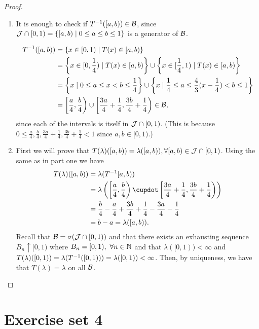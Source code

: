 \begin{proof}$ $\newline
	\begin{enumerate}
		\item It is enough to check if ${T}^{-1}([a,b)) \in \mathcal{B}$, since $\mathcal{J} \cap [0, 1) = \{[a, b) \mid 0 \leq a \leq b \leq 1\}$ is a generator of $\mathcal{B}$.
		
		\begin{align*}
		{T}^{-1}([a,b)) &= \{x \in [0, 1) \mid T(x) \in [a, b)\} \\
		&= \left\{x \in [0, \frac{1}{4}) \mid T(x) \in [a, b)\right\} \cup \left\{x \in [\frac{1}{4}, 1) \mid T(x) \in [a, b)\right\} \\
		&= \left\{x \mid 0 \leq a \leq x < b \leq \frac{1}{4}\right\} \cup \left\{x \mid \frac{1}{4} \leq a \leq \frac{4}{3}( x - \frac{1}{4}) < b \leq 1\right\} \\
		&= \left[\frac{a}{4}, \frac{b}{4}\right) \cup \left[\frac{3a}{4} + \frac{1}{4}, \frac{3b}{4} + \frac{1}{4}\right) \in \mathcal{B},
		\end{align*}
		since each of the intervals is itself in $\mathcal{J} \cap [0,1)$. (This is because $0 \leq \frac{a}{4}, \frac{b}{4}, \frac{3a}{4} + \frac{1}{4}, \frac{3b}{4} + \frac{1}{4} < 1$ since $a, b \in [0, 1)$.)
		
		\item First we will prove that $T(\lambda)([a, b)) = \lambda([a, b)), \forall [a, b) \in \mathcal{J} \cap [0,1)$. Using the same as in part one we have
		\begin{align*}
		T(\lambda)([a, b)) &= \lambda(\inv{T}[a,b))\\
		&= \lambda\left(\left[\frac{a}{4}, \frac{b}{4}\right) \cupdot \left[\frac{3a}{4} + \frac{1}{4}, \frac{3b}{4} + \frac{1}{4}\right)\right) \\
		&= \frac{b}{4} - \frac{a}{4} + \frac{3b}{4} + \frac{1}{4} - \frac{3a}{4} - \frac{1}{4} \\
		&= b - a = \lambda([a, b)).
		\end{align*} 
		Recall that $\mathcal{B} = \sigma(\mathcal{J} \cap [0,1))$ and that there exists an exhausting sequence $B_n \uparrow [0,1)$ where $B_n = [0,1),\ \forall n \in \mathbb{N}$ and that $\lambda([0, 1)) < \infty$ and $T(\lambda)([0,1)) = \lambda({T}^{-1}([0,1))) = \lambda([0,1)) < \infty$. Then, by uniqueness, we have that $T(\lambda) = \lambda$ on all $\mathcal{B}$.
	\end{enumerate}
\end{proof}

\section{Exercise set 4}

